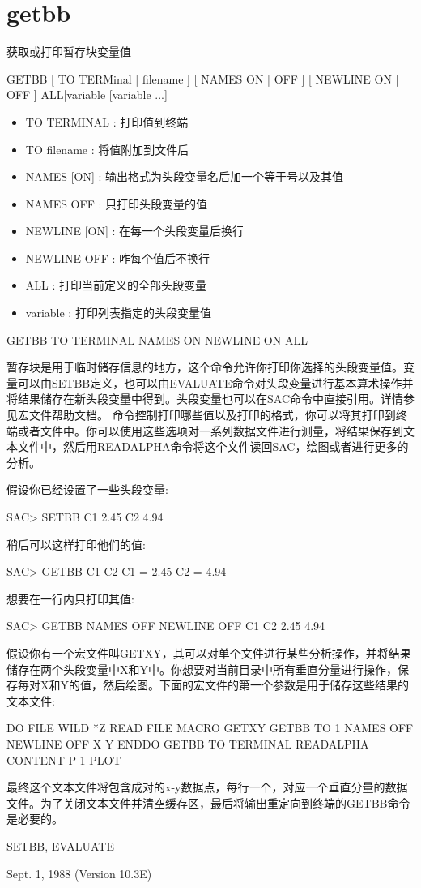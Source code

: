 \section{getbb}
\label{cmd:getbb}

获取或打印暂存块变量值

GETBB [ TO TERMinal | filename ] [ NAMES ON | OFF ] [ NEWLINE ON | OFF ] ALL|variable [variable ...]

\begin{itemize}
\item TO TERMINAL : 打印值到终端
\item TO filename : 将值附加到文件后
\item NAMES [ON] : 输出格式为头段变量名后加一个等于号以及其值
\item NAMES OFF :  只打印头段变量的值 
\item NEWLINE [ON] : 在每一个头段变量后换行 
\item NEWLINE OFF : 咋每个值后不换行 
\item ALL :  打印当前定义的全部头段变量 
\item variable : 打印列表指定的头段变量值 
\end{itemize}

GETBB TO TERMINAL NAMES ON NEWLINE ON ALL

暂存块是用于临时储存信息的地方，这个命令允许你打印你选择的头段变量值。变量可以由SETBB定义，也可以由EVALUATE命令对头段变量进行基本算术操作并将结果储存在新头段变量中得到。头段变量也可以在SAC命令中直接引用。详情参见宏文件帮助文档。
命令控制打印哪些值以及打印的格式，你可以将其打印到终端或者文件中。你可以使用这些选项对一系列数据文件进行测量，将结果保存到文本文件中，然后用READALPHA命令将这个文件读回SAC，绘图或者进行更多的分析。

假设你已经设置了一些头段变量:
\begin{SACCode}
SAC> SETBB C1 2.45 C2 4.94
\end{SACCode}
稍后可以这样打印他们的值:
\begin{SACCode}
SAC> GETBB C1 C2
 C1 = 2.45
 C2 = 4.94
\end{SACCode}
想要在一行内只打印其值:
\begin{SACCode}
SAC> GETBB NAMES OFF NEWLINE OFF C1 C2
 2.45 4.94
\end{SACCode}
假设你有一个宏文件叫GETXY，其可以对单个文件进行某些分析操作，并将结果储存在两个头段变量中X和Y中。你想要对当前目录中所有垂直分量进行操作，保存每对X和Y的值，然后绘图。下面的宏文件的第一个参数是用于储存这些结果的文本文件:
\begin{SACCode}
DO FILE WILD *Z
  READ FILE
  MACRO GETXY
  GETBB TO 1 NAMES OFF NEWLINE OFF X Y
ENDDO
GETBB TO TERMINAL
READALPHA CONTENT P 1
PLOT
\end{SACCode}
最终这个文本文件将包含成对的x-y数据点，每行一个，对应一个垂直分量的数据文件。为了关闭文本文件并清空缓存区，最后将输出重定向到终端的GETBB命令是必要的。

SETBB, EVALUATE

Sept. 1, 1988 (Version 10.3E)
